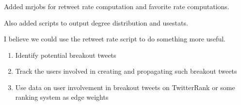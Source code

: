 Added mrjobs for retweet rate computation and favorite rate computations.

Also added scripts to output degree distribution and usestats.

I believe we could use the retweet rate script to do something more useful.
\begin{enumerate}
\item Identify potential breakout tweets
\item Track the users involved in creating and propagating such breakout tweets
\item Use data on user involvement in breakout tweets on TwitterRank or some ranking system as edge weights
\end{enumerate}